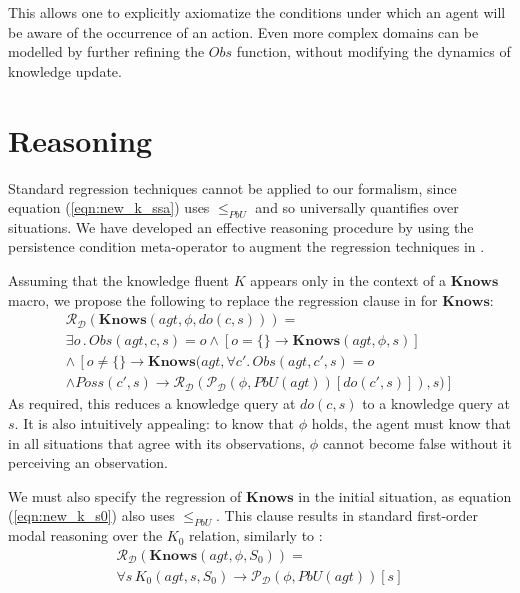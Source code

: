 \documentclass{ifaamas-submission}
\begin{document}
This allows one to explicitly axiomatize the conditions under which an agent
will be aware of the occurrence of an action. Even more complex domains can
be modelled by further refining the $Obs$ function, without modifying the
dynamics of knowledge update.

\section{Reasoning}

\label{sec:Reasoning}

Standard regression techniques cannot be applied to our formalism, 
since equation (\ref{eqn:new_k_ssa}) uses $\leq_{PbU}$ and so universally 
quantifies over situations.
We have developed an effective reasoning procedure
by using the persistence condition meta-operator \cite{kelly07sc_persistence}
to augment the regression techniques in \cite{scherl03sc_knowledge}.

Assuming that the knowledge fluent $K$ appears only in the context
of a $\mathbf{Knows}$ macro, we propose the following to replace
the regression clause in \cite{scherl03sc_knowledge} for $\mathbf{Knows}$:
\begin{multline}
\mathcal{R}_{\mathcal{D}}(\mathbf{Knows}(agt,\phi,do(c,s)))=\\
\exists o\,.\, Obs(agt,c,s)=o
\wedge\left[o=\{\}\rightarrow\mathbf{Knows}(agt,\phi,s)\right]\\
\wedge\,\left[o\neq\{\}\rightarrow\mathbf{Knows}(agt,\forall c'.\, Obs(agt,c',s)=o\right.\\
\left.\wedge Poss(c',s)\rightarrow\mathcal{R}_{\mathcal{D}}(\mathcal{P}_{\mathcal{D}}(\phi,PbU(agt))[do(c',s)]),s)\right]\label{eqn:R_do_c_s}
\end{multline}
As required, this reduces a knowledge query at $do(c,s)$ to a knowledge
query at $s$. It is also intuitively appealing: to know that $\phi$
holds, the agent must know that in all situations that agree with
its observations, $\phi$ cannot become false without it perceiving an
observation.

We must also specify the regression of $\mathbf{Knows}$ in the initial
situation, as equation (\ref{eqn:new_k_s0}) also uses $\leq_{PbU}$.
This clause results in standard first-order modal reasoning
over the $K_{0}$ relation, similarly to \cite{scherl03sc_knowledge}:
\begin{multline}
\mathcal{R}_{\mathcal{D}}(\mathbf{Knows}(agt,\phi,S_{0}))=\\
\forall s\, K_{0}(agt,s,S_{0})\rightarrow\mathcal{P}_{\mathcal{D}}(\phi,PbU(agt))[s]\label{eqn:R_s0}
\end{multline}
\end{document}
